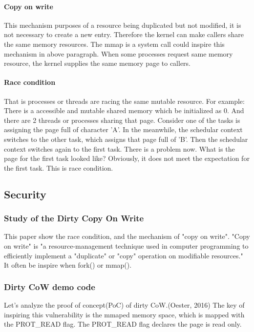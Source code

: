 \documentclass[12pt,a4paper]{IEEEconf}
\begin{document}
\paragraph{Copy on write}
This mechanism purposes of a resource being duplicated but not modified, it is not
necessary to create a new entry. Therefore the kernel can make callers share
the same memory resources. The mmap is a system call could inspire this mechanism
in above paragraph. When some processes request same memory resource, the kernel
supplies the same memory page to callers.

\paragraph{Race condition}
That is processes or threads are racing the same mutable resource. For example:
There is a accessible and mutable shared memory which be initialized as 0. And there
are 2 threads or processes sharing that page. Consider one of the tasks is assigning
the page full of character 'A'. In the meanwhile, the schedular context switches to
the other task, which assigns that page full of 'B'. Then the schedular context switches
again to the first task. There is a problem now. What is the page for the first
task looked like? Obviously, it does not meet the expectation for the first task.
This is race condition.

\subsection{Security}
\hypertarget{security}{}
\subsubsection{Study of the Dirty Copy On Write}
This paper\cite{Study_Dirty_Cow} show the race condition, and the mechanism of
"copy on write". "Copy on write" is "a resource-management technique used in
computer programming to efficiently implement a "duplicate" or "copy" operation
on modifiable resources." \cite{CoW_wiki} It often be inspire when fork() or mmap().

\subsubsection{Dirty CoW demo code}
Let's analyze the proof of concept(PoC) of dirty CoW.(Oester, 2016)\cite{Dirty_CoW}
The key of inspiring this vulnerability is the mmaped memory space, which is mapped with
the PROT\_READ flag. The PROT\_READ flag declares the page is read only.

\end{document}
